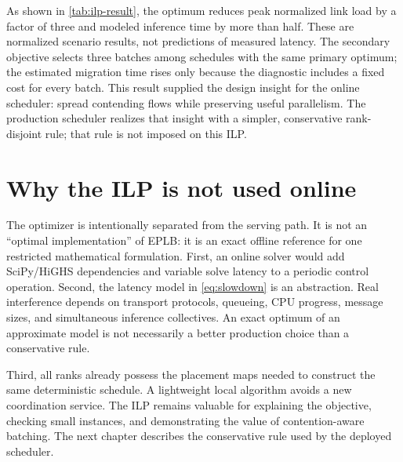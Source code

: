 As shown in \cref{tab:ilp-result}, the optimum reduces peak normalized link load by
a factor of three and modeled inference time by more than half. These are
normalized scenario results, not predictions of measured latency. The secondary
objective selects three batches among schedules with the same primary optimum;
the estimated migration time rises only because the diagnostic includes a
fixed cost for every batch. This result supplied the design insight for the
online scheduler: spread contending flows while preserving useful parallelism.
The production scheduler realizes that insight with a simpler, conservative
rank-disjoint rule; that rule is not imposed on this ILP.

\section{Why the ILP is not used online}

The optimizer is intentionally separated from the serving path. It is not an
``optimal implementation'' of EPLB: it is an exact offline reference for one
restricted mathematical formulation. First, an
online solver would add SciPy/HiGHS dependencies and variable solve latency to
a periodic control operation. Second, the latency model in
\cref{eq:slowdown} is an abstraction. Real interference depends on transport
protocols, queueing, CPU progress, message sizes, and simultaneous inference
collectives. An exact optimum of an approximate model is not necessarily a
better production choice than a conservative rule.

Third, all ranks already possess the placement maps needed to construct the
same deterministic schedule. A lightweight local algorithm avoids a new
coordination service. The ILP remains valuable for explaining the objective,
checking small instances, and demonstrating the value of contention-aware
batching. The next chapter describes the conservative rule used by the
deployed scheduler.

